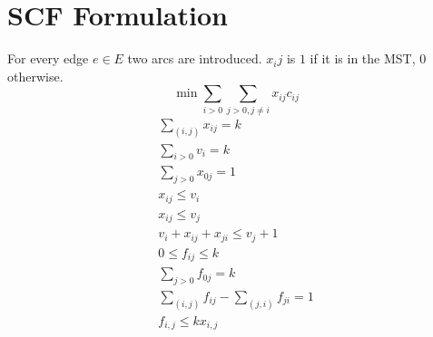\documentclass[a4paper]{article}
\begin{document}
\section{SCF Formulation}
For every edge $e \in E$ two arcs are introduced. $x_ij$ is $1$ if it is in the MST, $0$ otherwise.
\begin{equation}
	\min \sum_{i>0}{ \sum_{j>0,j\not =i}{x_{ij}c_{ij}}}
\end{equation}
\begin{align}
	\sum_{(i,j)} x_{ij} = k\\
	\sum_{i>0}v_i =k \\
	\sum_{j>0} x_{0j}=1\\
	x_{ij} \leq v_i\\
	x_{ij} \leq v_j\\
	v_i + x_{ij} + x_{ji} \leq v_j + 1\\
	0 \leq f_{ij} \leq k\\
	\sum_{j>0} f_{0j}=k \\
	\sum_{(i,j)} f_{ij} - \sum_{(j,i)} f_{ji} = 1\\
	f_{i,j}\leq kx_{i,j}
\end{align}
\end{document}
